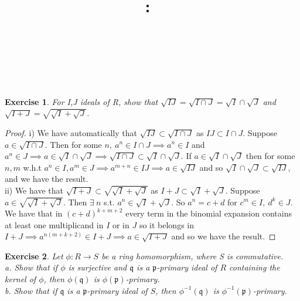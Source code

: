 \documentclass{article}
\title{
    \vspace{2in}
    \textmd{\textbf{\hmwkClass:\ \hmwkTitle}}\\
    \vspace{0.1in}
    \textmd{\hmwkDueDate} \\
    \vspace{0.2in}\large{\textit{\hmwkClassInstructor\  }}
    \vspace{2in}
}
\author{\hmwkAuthorName}
\date{}
\newcommand{\fk}[1]{\mathfrak{#1}}
\newtheorem{exercise}{Exercise}
\begin{document}
\maketitle

\newpage

\begin{exercise}
  For I,J ideals of R, show that $\sqrt{IJ} = \sqrt{I \cap J} = \sqrt{I} \cap \sqrt{J}$ and $\sqrt{I + J} = \sqrt{\sqrt{I} + \sqrt{J}}$.
\end{exercise}
\begin{proof}
  i) We have automatically that $\sqrt{IJ} \subset \sqrt{I \cap J}$ as $IJ \subset I \cap J$. Suppose $a \in \sqrt{I \cap J}$. Then for some $n, \ a^{n} \in I \cap J \implies a^{n} \in I$ and $a^{n} \in J \implies a \in \sqrt{I}\cap \sqrt{J} \implies \sqrt{I \cap J} \subset \sqrt{I} \cap \sqrt{J}$. If $a \in \sqrt{I} \cap \sqrt{J}$ then for some $n, m$ w.h.t $a^{n} \in I, a^{m} \in J \implies a^{m+n} \in IJ \implies a \in \sqrt{IJ}$ and so $\sqrt{I}\cap\sqrt{J} \subset \sqrt{IJ}$, and we have the result. \\
  ii) We have that $\sqrt{I + J}\subset \sqrt{\sqrt{I}+ \sqrt{J}}$ as $I + J \subset \sqrt{I} + \sqrt{J}$. Suppose $a \in \sqrt{\sqrt{I}+ \sqrt{J}}$. Then $\exists \ n$ s.t. $a^{n} \in \sqrt{I} + \sqrt{J}$. So $a^{n} = c + d$ for $c^{m} \in I, \ d^{k} \in J$. We have that in $(c+d)^{k+m+2}$ every term in the binomial expansion contains at least one multiplicand in $I$ or in $J$ so it belongs in $I + J \implies a^{n(m+k+2)} \in I + J \implies a \in \sqrt{I + J}$ and so we have the result.  
\end{proof}
\begin{exercise}
  Let $\phi: R \to S$ be a ring homomorphism, where S is commutative. \\
  a. Show that if $\phi$ is surjective and $\fk{q}$ is a $\fk{p}$-primary ideal of $R$ containing the kernel of $\phi$, then $\phi(\fk{q})$ is $\phi(\fk{p})$-primary. \\
  b. Show that if $\fk{q}$ is a $\fk{p}$-primary ideal of $S$, then $\phi^{-1}(\fk{q})$ is $\phi^{-1}(\fk{p})$-primary.
\end{exercise}
\end{document}

